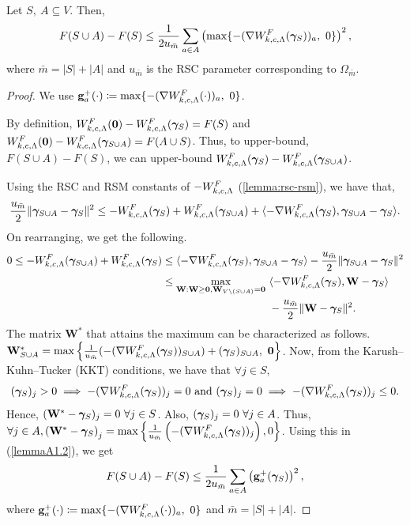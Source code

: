 \begin{lemma}\label{lemma2.2}
Let $S,\ A\subseteq V$. Then,
$$F(S\cup A) - F(S)\leq \frac{1}{2u_{\bar{m}}}\sum_{a\in A}\left(\max\{-(\nabla W^F_{k, c, \Lambda}(\bm{\gamma}_S))_a,\ 0\}\right)^2,$$ where $\bar{m} = |S|+|A|$ and $u_{\bar{m}}$ is the RSC parameter corresponding to $\Omega_{\bar{m}}$.
\end{lemma}
\begin{proof}
We use $\mathbf{g}^+_a(\cdot)\coloneqq \max\{-(\nabla W^F_{k, c, \Lambda}(\cdot))_a,\ 0\}$.

By definition, $W^F_{k, c, \Lambda}(\mathbf{0})-W^F_{k, c, \Lambda}(\bm{\gamma}_S)= F(S)$ and $W^F_{k, c, \Lambda}(\mathbf{0})-W^F_{k, c, \Lambda}(\bm{\gamma}_{S\cup A})=F(A\cup S)$. Thus, to upper-bound, $F(S\cup A)-F(S)$, we can upper-bound $W^F_{k, c, \Lambda}(\bm{\gamma}_S)-W^F_{k, c, \Lambda}(\bm{\gamma}_{S\cup A})$. 


Using the RSC and RSM constants of $-W^F_{k, c, \Lambda}$ (\ref{lemma:rsc-rsm}), we have that,
$$\frac{u_{\bar{m}}}{2}\|\bm{\gamma}_{S\cup A}-\bm{\gamma}_S\|^2 \leq -W^F_{k, c, \Lambda}(\bm{\gamma}_S) + W^F_{k, c, \Lambda}(\bm{\gamma}_{S\cup A}) + \langle-\nabla W^F_{k, c, \Lambda}(\bm{\gamma}_S), \bm{\gamma}_{S\cup A}-\bm{\gamma}_S \rangle.$$ On rearranging, we get the following.
\begin{align}\label{lemmaA1.2}
0\leq -W^F_{k, c, \Lambda}(\bm{\gamma}_{S\cup A})+W^F_{k, c, \Lambda}(\bm{\gamma}_S) &\leq \langle -\nabla W^F_{k, c, \Lambda}(\bm{\gamma}_S), \bm{\gamma}_{S\cup A}-\bm{\gamma}_S \rangle -\frac{u_{\bar{m}}}{2}\|\bm{\gamma}_{S\cup A}-\bm{\gamma}_S\|^2 \nonumber\\
& \leq \max_{\mathbf{W}:\mathbf{W}\geq \mathbf{0}, \mathbf{W}_{V\setminus(S\cup A)}=\mathbf{0}} \ \langle-\nabla W^F_{k, c, \Lambda}(\bm{\gamma}_S), \mathbf{W} - \bm{\gamma}_S\rangle \nonumber \\ &\qquad\qquad\qquad\qquad\qquad-\frac{u_{\bar{m}}}{2}\|\mathbf{W}-\bm{\gamma}_S\|^2.
\end{align} 
The matrix $\mathbf{W}^*$ that attains the maximum can be characterized as follows. 
\newline $\mathbf{W}^*_{S\cup A}=\max\left\{\frac{1}{u_{\bar{m}}}(-(\nabla W^F_{k, c, \Lambda}(\bm{\gamma}_S))_{S\cup A})+(\bm{\gamma}_S)_{S\cup A}, \ \mathbf{0} \right\}$. Now, from the Karush–Kuhn–Tucker (KKT) conditions, we have that $\forall j\in S$,
$$
(\bm{\gamma}_S)_j > 0 \implies -(\nabla W^F_{k, c, \Lambda}(\bm{\gamma}_S))_j=0 \textup{ and }(\bm{\gamma}_S)_j = 0 \implies -(\nabla W^F_{k, c, \Lambda}(\bm{\gamma}_S))_j\leq 0.
$$
Hence, $(\mathbf{W}^*-\bm{\gamma}_S)_j=0~\forall j\in S$. Also, $(\bm{\gamma}_S)_j=0\ \forall j\in A$. Thus, $\forall j\in A, \left(\mathbf{W}^*-\bm{\gamma}_S\right)_j=\max \left\{\frac{1}{u_{\bar{m}}}\left(-(\nabla W^F_{k, c, \Lambda}(\bm{\gamma}_S))_j\right), 0 \right\}$. Using this in (\ref{lemmaA1.2}), we get 
$$
F(S\cup A)-F(S)\leq \frac{1}{2u_{\bar{m}}}\sum_{a\in A}\left(\mathbf{g}_a^+(\bm{\gamma}_S)\right)^2,
$$ where $\mathbf{g}_a^+(\cdot)\coloneqq \max\{-(\nabla W^F_{k, c, \Lambda}(\cdot))_a,\ 0\}$ and $\bar{m} = |S|+|A|$.
\end{proof}

